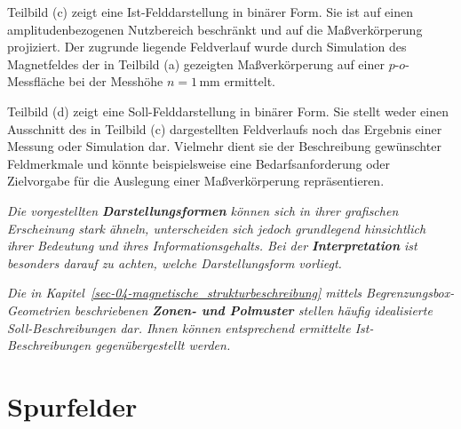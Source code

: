 \documentclass[
  ngerman,
  a4paper,
  twoside]{scrbook}
\newcounter{quartocallouttipno}
\newcommand{\quartocallouttip}[1]{\refstepcounter{quartocallouttipno}\label{#1}}
\begin{document}
Teilbild (c) zeigt eine Ist-Felddarstellung in binärer Form. Sie ist auf
einen amplitudenbezogenen Nutzbereich beschränkt und auf die
Maßverkörperung projiziert. Der zugrunde liegende Feldverlauf wurde
durch Simulation des Magnetfeldes der in Teilbild (a) gezeigten
Maßverkörperung auf einer \(p\)-\(o\)-Messfläche bei der Messhöhe
\(n = 1\,\mathrm{mm}\) ermittelt.

Teilbild (d) zeigt eine Soll-Felddarstellung in binärer Form. Sie stellt
weder einen Ausschnitt des in Teilbild (c) dargestellten Feldverlaufs
noch das Ergebnis einer Messung oder Simulation dar. Vielmehr dient sie
der Beschreibung gewünschter Feldmerkmale und könnte beispielsweise eine
Bedarfsanforderung oder Zielvorgabe für die Auslegung einer
Maßverkörperung repräsentieren.

\begin{tcolorbox}[enhanced jigsaw, arc=.35mm, bottomrule=.15mm, bottomtitle=1mm, breakable, colback=white, colbacktitle=quarto-callout-tip-color!10!white, colframe=quarto-callout-tip-color-frame, coltitle=black, left=2mm, leftrule=.75mm, opacityback=0, opacitybacktitle=0.6, rightrule=.15mm, title=\textcolor{quarto-callout-tip-color}{\faLightbulb}\hspace{0.5em}{Hinweis \ref*{tip-05-darstellung_zonen-soll}}, titlerule=0mm, toprule=.15mm, toptitle=1mm]

\quartocallouttip{tip-05-darstellung_zonen-soll} 

\emph{Die vorgestellten \textbf{Darstellungsformen} können sich in ihrer
grafischen Erscheinung stark ähneln, unterscheiden sich jedoch
grundlegend hinsichtlich ihrer Bedeutung und ihres Informationsgehalts.
Bei der \textbf{Interpretation} ist besonders darauf zu achten, welche
Darstellungsform vorliegt.}

\vspace{0.7\baselineskip}

\emph{Die in Kapitel~\ref{sec-04-magnetische_strukturbeschreibung}
mittels Begrenzungsbox-Geometrien beschriebenen \textbf{Zonen- und
Polmuster} stellen häufig idealisierte Soll-Beschreibungen dar. Ihnen
können entsprechend ermittelte Ist-Beschreibungen gegenübergestellt
werden.}

\end{tcolorbox}

\section{Spurfelder}\label{sec-05-spurfelder}
\end{document}
